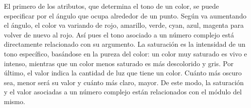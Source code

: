 El primero de los atributos, que determina el tono de un color, se puede especificar por el ángulo que ocupa alrededor de un punto. Según va aumentando el ángulo, el color va variando de rojo, amarillo, verde, cyan, azul, magenta para volver de nuevo al rojo. Así pues el tono asociado a un número complejo está directamente relacionado con su argumento. La saturación es la intensidad de un tono específico, basándose en la pureza del color: un color muy saturado es vivo e intenso, mientras que un color menos saturado es más descolorido y gris. Por último, el valor indica la cantidad de luz que tiene un color. Cuánto más oscuro sea, menor será su valor y cuánto más claro, mayor. De este modo, la saturación y el valor asociadas a un número complejo están relacionados con el módulo del mismo. \\

